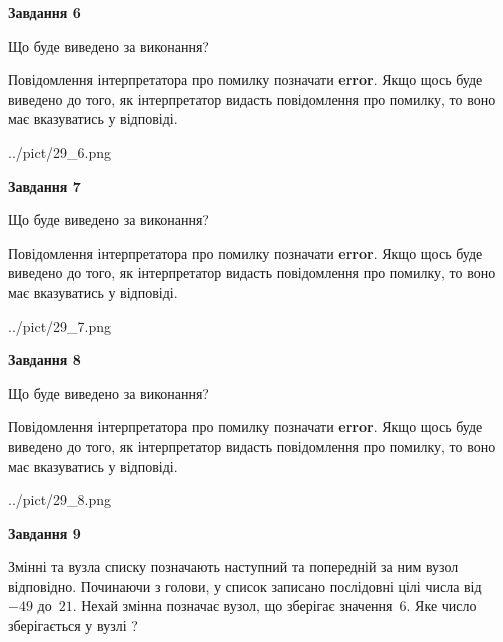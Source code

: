 \documentclass[12pt, ukrainian]{article}
\begin{document}
{\begin {large}
{\begin {center}\textbf{Завдання 6}\end {center}}\par
Що буде виведено за виконання?

Повідомлення інтерпретатора про помилку позначати \textbf{error}.
Якщо щось буде виведено до того, як інтерпретатор видасть повідомлення про помилку, 
то воно має вказуватись у відповіді. \par


\begin{center}
	{../pict/29_6.png}
\end{center}
\newpage

{\begin {center}\textbf{Завдання 7}\end {center}}\par
Що буде виведено за виконання?

Повідомлення інтерпретатора про помилку позначати \textbf{error}.
Якщо щось буде виведено до того, як інтерпретатор видасть повідомлення про помилку, 
то воно має вказуватись у відповіді. \par


\begin{center}
	{../pict/29_7.png}
\end{center}
\newpage

{\begin {center}\textbf{Завдання 8}\end {center}}\par
Що буде виведено за виконання?

Повідомлення інтерпретатора про помилку позначати \textbf{error}.
Якщо щось буде виведено до того, як інтерпретатор видасть повідомлення про помилку, 
то воно має вказуватись у відповіді. \par


\begin{center}
	{../pict/29_8.png}
\end{center}
\newpage

{\begin {center}\textbf{Завдання 9}\end {center}}\par
Змінні  та  вузла списку позначають наступний та попередній за ним вузол відповідно. Починаючи з голови, у список записано послідовні цілі числа від~$-49$ до~$21$. Нехай змінна  позначає вузол, що зберігає значення~$6$.
Яке число зберігається у вузлі  ?\par
\newpage


\end{large}}
\end{document}
